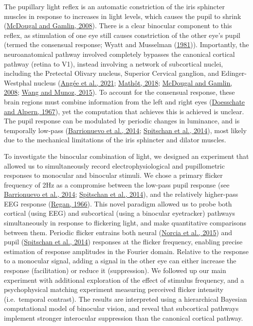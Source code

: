 \documentclass[
]{article}
\begin{document}
The pupillary light reflex is an automatic constriction of the iris sphincter muscles in response to increases in light levels, which causes the pupil to shrink (\protect\hyperlink{ref-McDougal2008}{McDougal and Gamlin, 2008}). There is a clear binocular component to this reflex, as stimulation of one eye still causes constriction of the other eye's pupil (termed the consensual response; Wyatt and Musselman (\protect\hyperlink{ref-Wyatt1981}{1981})). Importantly, the neuroanatomical pathway involved completely bypasses the canonical cortical pathway (retina to V1), instead involving a network of subcortical nuclei, including the Pretectal Olivary nucleus, Superior Cervical ganglion, and Edinger-Westphal nucleus (\protect\hyperlink{ref-Angee2021}{Angée et al., 2021}; \protect\hyperlink{ref-Mathot2018}{Mathôt, 2018}; \protect\hyperlink{ref-McDougal2008}{McDougal and Gamlin, 2008}; \protect\hyperlink{ref-Wang2015}{Wang and Munoz, 2015}). To account for the consensual response, these brain regions must combine information from the left and right eyes (\protect\hyperlink{ref-Doesschate1967}{Doesschate and Alpern, 1967}), yet the computation that achieves this is achieved is unclear. The pupil response can be modulated by periodic changes in luminance, and is temporally low-pass (\protect\hyperlink{ref-Barrionuevo2014}{Barrionuevo et al., 2014}; \protect\hyperlink{ref-Spitschan2014}{Spitschan et al., 2014}), most likely due to the mechanical limitations of the iris sphincter and dilator muscles.

To investigate the binocular combination of light, we designed an experiment that allowed us to simultaneously record electrophysiological and pupillometric responses to monocular and binocular stimuli. We chose a primary flicker frequency of 2Hz as a compromise between the low-pass pupil response (see \protect\hyperlink{ref-Barrionuevo2014}{Barrionuevo et al., 2014}; \protect\hyperlink{ref-Spitschan2014}{Spitschan et al., 2014}), and the relatively higher-pass EEG response (\protect\hyperlink{ref-Regan1966}{Regan, 1966}). This novel paradigm allowed us to probe both cortical (using EEG) and subcortical (using a binocular eyetracker) pathways simultaneously in response to flickering light, and make quantitative comparisons between them. Periodic flicker entrains both neural (\protect\hyperlink{ref-Norcia2015}{Norcia et al., 2015}) and pupil (\protect\hyperlink{ref-Spitschan2014}{Spitschan et al., 2014}) responses at the flicker frequency, enabling precise estimation of response amplitudes in the Fourier domain. Relative to the response to a monocular signal, adding a signal in the other eye can either increase the response (facilitation) or reduce it (suppression). We followed up our main experiment with additional exploration of the effect of stimulus frequency, and a psychophysical matching experiment measuring perceived flicker intensity (i.e.~temporal contrast). The results are interpreted using a hierarchical Bayesian computational model of binocular vision, and reveal that subcortical pathways implement stronger interocular suppression than the canonical cortical pathway.
\end{document}
